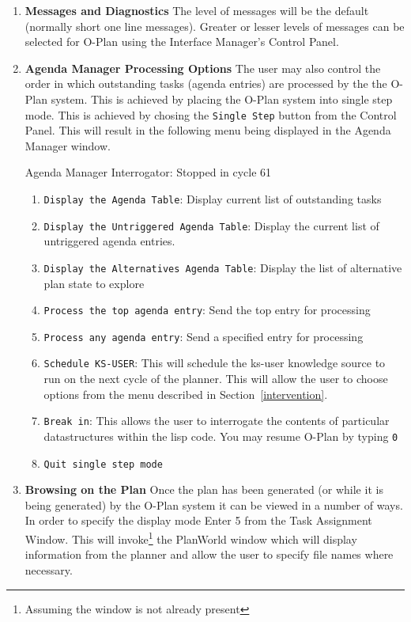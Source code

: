 \begin{enumerate}
\item  {\bf Messages and Diagnostics} \newline
The level of messages will be the default (normally short one line
messages). Greater or lesser levels of messages can be selected for
O-Plan using the Interface Manager's Control Panel. 

\item {\bf Agenda Manager Processing Options} \newline
The user may also control the order in which outstanding tasks (agenda
entries) are processed by the the O-Plan system. This is achieved by
placing the O-Plan system into single step mode. This is achieved by
chosing the {\tt Single Step} button from the Control Panel. This
will result in the following menu being displayed in the Agenda
Manager window.

Agenda Manager Interrogator: \newline
Stopped in cycle 61
\begin{enumerate}
\item {\tt Display the Agenda Table}: Display current list of
outstanding tasks
\item {\tt Display the Untriggered Agenda Table}: Display the current
list of untriggered agenda entries. 
\item {\tt Display the Alternatives Agenda Table}: Display the list of 
alternative plan state to explore
\item {\tt Process the top agenda entry}: Send the top entry for processing
\item {\tt Process any agenda entry}: Send a specified entry for
processing
\item {\tt Schedule KS-USER}: This will schedule the {\sc ks-user}
knowledge source to run on the next cycle of the planner. This will
allow the user to choose options from the menu described in
Section~\ref{intervention}.
\item {\tt Break in}: This allows the user to interrogate the contents
of particular datastructures within the {\sc lisp} code. You may
resume O-Plan by typing {\tt 0} 

\item {\tt Quit single step mode}
\end{enumerate}

\item {\bf Browsing on the Plan} \newline
Once the plan has been generated (or while it is being generated) by
the O-Plan system it can be viewed in a number of ways. In order to
specify the display mode Enter 5 from the Task Assignment Window.
This will invoke\footnote{Assuming the window is not already present}
the PlanWorld window which will display information from the planner
and allow the user to specify file names where necessary. 


\end{enumerate}
